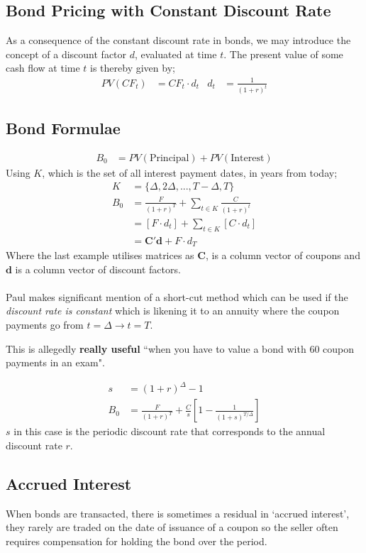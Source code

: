 \documentclass[a4paper]{article}
\begin{document}
\subsection{Bond Pricing with Constant Discount Rate}
As a consequence of the constant discount rate in bonds, we may introduce
the concept of a discount factor $d$, evaluated at time $t$. The present value
of some cash flow at time $t$ is thereby given by;
\begin{align*}
PV(CF_t) &= CF_t \cdot d_t & d_t &= \frac{1}{(1+r)^t}
\end{align*}
\subsection{Bond Formulae}
\begin{align*}
B_0 &= PV(\text{Principal}) + PV(\text{Interest})
\end{align*}
Using $K$, which is the set of all interest payment dates, in years from today;
\begin{align*}
K &= \{ \Delta, 2 \Delta, ..., T - \Delta, T \} \\
B_0 &= \frac{F}{(1+r)^T} + \sum_{t \in K} \frac{C}{(1+r)^t} \\
&= [F\cdot d_t] + \sum_{t \in K} [C \cdot d_t] \\
&= \mathbf{C'd} + F \cdot d_T
\end{align*}
Where the last example utilises matrices as $\mathbf{C}$, is a column
vector of coupons and $\mathbf{d}$ is a column vector of discount factors.\\\\
%
%
Paul makes significant mention of a short-cut method which can be used if
the \emph{discount rate is constant} which is likening it to an annuity where
the coupon payments go from $t = \Delta \to t = T$.

This is allegedly
\textbf{really useful} ``when you have to value a bond with 60 coupon payments
in an exam".

\begin{align*}
s &= (1 + r)^{\Delta} - 1 \\
B_0 &= \frac{F}{(1+r)^T} + \frac{C}{s} \left [ 1- \frac{1}{(1 + s)^{T/\Delta}} \right ]
\end{align*}
%
$s$ in this case is the periodic discount rate that corresponds to the annual
discount rate $r$.
\subsection{Accrued Interest}
When bonds are transacted, there is sometimes a residual in `accrued interest',
they rarely are traded on the date of issuance of a coupon so the seller
often requires compensation for holding the bond over the period.
\end{document}
